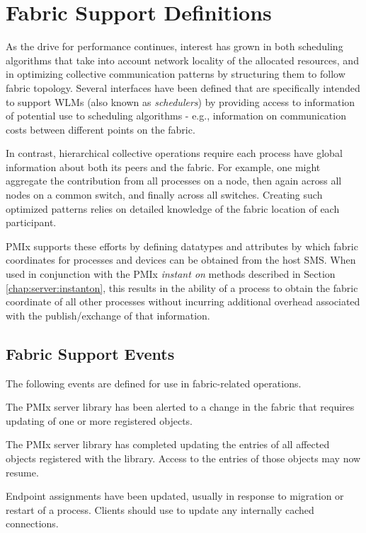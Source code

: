 \chapter{Fabric Support Definitions}
\label{chap:api_fabric}

As the drive for performance continues, interest has grown in both scheduling algorithms that take into account network locality of the allocated resources, and in optimizing collective communication patterns by structuring them to follow fabric topology. Several interfaces have been defined that are specifically intended to support \acp{WLM} (also known as \emph{schedulers}) by providing access to information of potential use to scheduling algorithms - e.g., information on communication costs between different points on the fabric.

In contrast, hierarchical collective operations require each process have global information about both its peers and the fabric. For example, one might aggregate the contribution from all processes on a node, then again across all nodes on a common switch, and finally across all switches. Creating such optimized patterns relies on detailed knowledge of the fabric location of each participant.

\ac{PMIx} supports these efforts by defining datatypes and attributes by which fabric coordinates for processes and devices can be obtained from the host \ac{SMS}. When used in conjunction with the \ac{PMIx} \emph{instant on} methods described in Section \ref{chap:server:instanton}, this results in the ability of a process to obtain the fabric coordinate of all other processes without incurring additional overhead associated with the publish/exchange of that information.



\section{Fabric Support Events}
\label{api:sched:consts}

The following events are defined for use in fabric-related operations.

\begin{constantdesc}

%
The \ac{PMIx} server library has been alerted to a change in the fabric that requires updating of one or more registered  objects.

%
The \ac{PMIx} server library has completed updating the entries of all affected  objects registered with the library. Access to the entries of those objects may now resume.

%
Endpoint assignments have been updated, usually in response to migration
or restart of a process. Clients should use  to update any
internally cached connections.

\end{constantdesc}

